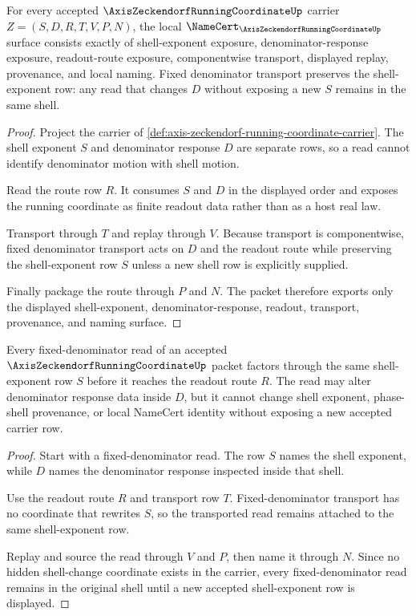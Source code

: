 \begin{theorem}
\label{thm:axis-zeckendorf-running-coordinate-surface}
For every accepted $\AxisZeckendorfRunningCoordinateUp$ carrier $Z=(S,D,R,T,V,P,N)$, the local $\NameCert_{\AxisZeckendorfRunningCoordinateUp}$ surface consists exactly of shell-exponent exposure, denominator-response exposure, readout-route exposure, componentwise transport, displayed replay, provenance, and local naming. Fixed denominator transport preserves the shell-exponent row: any read that changes $D$ without exposing a new $S$ remains in the same shell.
\end{theorem}
\begin{proof}
Project the carrier of \autoref{def:axis-zeckendorf-running-coordinate-carrier}. The shell exponent $S$ and denominator response $D$ are separate rows, so a read cannot identify denominator motion with shell motion.

Read the route row $R$. It consumes $S$ and $D$ in the displayed order and exposes the running coordinate as finite readout data rather than as a host real law.

Transport through $T$ and replay through $V$. Because transport is componentwise, fixed denominator transport acts on $D$ and the readout route while preserving the shell-exponent row $S$ unless a new shell row is explicitly supplied.

Finally package the route through $P$ and $N$. The packet therefore exports only the displayed shell-exponent, denominator-response, readout, transport, provenance, and naming surface.
\end{proof}

\begin{theorem}
\label{thm:axis-zeckendorf-fixed-denominator-nonescape}
Every fixed-denominator read of an accepted $\AxisZeckendorfRunningCoordinateUp$ packet factors through the same shell-exponent row $S$ before it reaches the readout route $R$. The read may alter denominator response data inside $D$, but it cannot change shell exponent, phase-shell provenance, or local NameCert identity without exposing a new accepted carrier row.
\end{theorem}
\begin{proof}
Start with a fixed-denominator read. The row $S$ names the shell exponent, while $D$ names the denominator response inspected inside that shell.

Use the readout route $R$ and transport row $T$. Fixed-denominator transport has no coordinate that rewrites $S$, so the transported read remains attached to the same shell-exponent row.

Replay and source the read through $V$ and $P$, then name it through $N$. Since no hidden shell-change coordinate exists in the carrier, every fixed-denominator read remains in the original shell until a new accepted shell-exponent row is displayed.
\end{proof}

